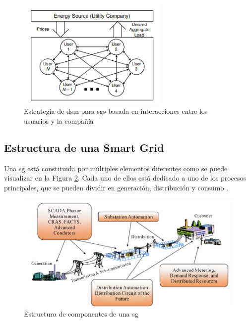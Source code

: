 \vspace{3mm}

\begin{figure}[h!]
  \centering
  \includegraphics[width=0.65\textwidth]{img/teoria/dsm2.png}
  \caption{Estrategia de \acrshort{dsm} para \acrshort{sg}s basada en interacciones entre los usuarios y la compañía \cite{pricing}}
  \label{fig:dsm2}
\end{figure}


\subsection{Estructura de una Smart Grid}

Una \gls{sg} está constituida por múltiples elementos diferentes como se puede visualizar en la Figura \ref{fig:estructura_sg}. Cada uno de ellos está dedicado a uno de los procesos principales, que se pueden dividir en generación, distribución y consumo \cite{smartgrid_overview}.

\begin{figure}[h!]
  \centering
  \includegraphics[width=1\textwidth]{img/teoria/estructura_sg.png}
  \caption{Estructura de componentes de una \acrshort{sg} \cite{smartgrid_overview}}
  \label{fig:estructura_sg}
\end{figure}

